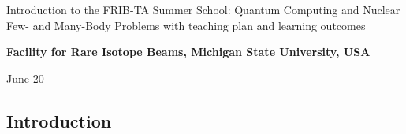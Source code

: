 \documentclass[%
oneside,                 %
final,                   %
10pt]{article}
\begin{document}

\newcommand{\exercisesection}[1]{\subsection*{#1}}






\thispagestyle{empty}

\begin{center}
{\LARGE\bf
\begin{spacing}{1.25}
Introduction to the FRIB-TA Summer School: Quantum Computing and Nuclear Few- and Many-Body Problems with teaching plan and learning outcomes
\end{spacing}
}
\end{center}


\begin{center}
{\bf Facility for Rare Isotope Beams, Michigan State University, USA${}^{}$} \\ [0mm]
\end{center}

\begin{center}
\end{center}
    

\begin{center}
June 20
\end{center}

\vspace{1cm}


\subsection*{Introduction}
\end{document}
